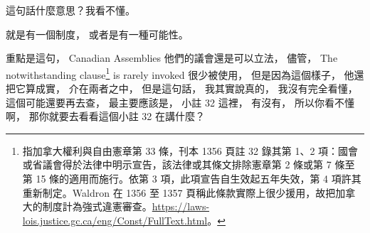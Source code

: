 \hypertarget{w06:cue:957}{}這句話什麼意思？我看不懂。

\hypertarget{w06:cue:958}{}就是有一個制度，
\hypertarget{w06:cue:959}{}或者是有一種可能性。

\hypertarget{w06:cue:960}{}重點是這句，
\hypertarget{w06:cue:961}{}Canadian Assemblies
\hypertarget{w06:cue:962}{}他們的議會還是可以立法，
\hypertarget{w06:cue:963}{}儘管，
\hypertarget{w06:cue:964}{}The notwithstanding clause\footnote{指加拿大權利與自由憲章第 33 條，刊本 1356 頁註 32 錄其第 1、2 項：國會或省議會得於法律中明示宣告，該法律或其條文排除憲章第 2 條或第 7 條至第 15 條的適用而施行。依第 3 項，此項宣告自生效起五年失效，第 4 項許其重新制定。Waldron 在 1356 至 1357 頁稱此條款實際上很少援用，故把加拿大的制度計為強式違憲審查。\url{https://laws-lois.justice.gc.ca/eng/Const/FullText.html}。} is rarely invoked
\hypertarget{w06:cue:965}{}很少被使用，
\hypertarget{w06:cue:966}{}但是因為這個樣子，
\hypertarget{w06:cue:967}{}他還把它算成實，
\hypertarget{w06:cue:968}{}介在兩者之中，
\hypertarget{w06:cue:969}{}但是這句話，
\hypertarget{w06:cue:970}{}我其實說真的，
\hypertarget{w06:cue:971}{}我沒有完全看懂，
\hypertarget{w06:cue:972}{}這個可能還要再去查，
\hypertarget{w06:cue:973}{}最主要應該是，
\hypertarget{w06:cue:974}{}小註 32 這裡，
\hypertarget{w06:cue:975}{}有沒有，
\hypertarget{w06:cue:976}{}所以你看不懂啊，
\hypertarget{w06:cue:977}{}那你就要去看看這個小註 32 在講什麼？

